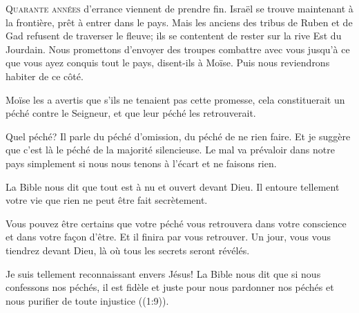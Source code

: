 



\lettrine{Q}{uarante années} d'errance viennent de prendre fin.
 Israël se trouve maintenant à la frontière, prêt à entrer dans le pays.
 Mais les anciens des tribus de Ruben et de Gad
 refusent de traverser le fleuve;
 ils se contentent de rester sur la rive Est du Jourdain.
 \Og Nous promettons d'envoyer des troupes combattre avec vous
 jusqu'à ce que vous ayez conquis tout le pays,
 disent-ils à Moïse. Puis nous reviendrons habiter de ce côté. \Fg{}

Moïse les a avertis que s'ils ne tenaient pas cette promesse,
 cela constituerait un péché contre le Seigneur,
 et que leur péché les retrouverait.

Quel péché? Il parle du péché d'omission, du péché de ne rien faire.
 Et je suggère que c'est là le péché de la majorité silencieuse.
 Le mal va prévaloir dans notre pays simplement
 si nous nous tenons à l'écart et ne faisons rien.


La Bible nous dit que tout est à nu et ouvert devant Dieu.
 Il entoure tellement votre vie que rien ne peut être fait secrètement.

Vous pouvez être certains que votre péché vous retrouvera
 dans votre conscience et dans votre fa\c{c}on d'être.
 Et il finira par vous retrouver.
 Un jour, vous vous tiendrez devant Dieu,
 là où tous les secrets seront révélés.

Je suis tellement reconnaissant envers Jésus! La Bible nous dit que
 \Og si nous confessons nos péchés, il est fidèle et juste
 pour nous pardonner nos péchés et nous purifier
 de toute injustice \Fg{} ((1:9)). 

\dvrule





